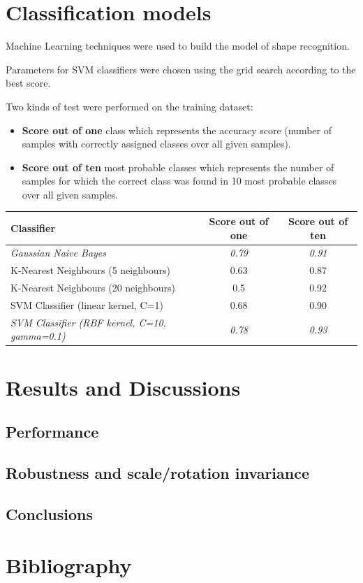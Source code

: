 \documentclass[12pt]{article}
\begin{document}
\section{Classification models}

Machine Learning techniques were used to build the model of shape recognition. 

Parameters for SVM classifiers were chosen using the grid search according to the best score.

Two kinds of test were performed on the training dataset:
\begin{itemize}
	\item \textbf{Score out of one} class which represents the accuracy score (number of samples with correctly assigned classes over all given samples).
	\item \textbf{Score out of ten} most probable classes which represents the number of samples for which the correct class was found in 10 most probable classes over all given samples.
\end{itemize}

\begin{center}
  \begin{tabular}{| l | c | c |}
    \hline
    \textbf{Classifier} & \textbf{Score out of one} & \textbf{Score out of ten}\\ \hline \hline
    \textit{Gaussian Naive Bayes} & \textit{0.79} & \textit{0.91} \\ \hline
	K-Nearest Neighbours (5 neighbours) & 0.63 & 0.87\\ \hline
	K-Nearest Neighbours (20 neighbours) & 0.5 & 0.92 \\ \hline
	SVM Classifier (linear kernel, C=1) & 0.68 & 0.90 \\ \hline
	\textit{SVM Classifier (RBF kernel, C=10, gamma=0.1)} & \textit{0.78} & \textit{0.93} \\ 
	\hline
  \end{tabular}
\end{center}


\section{Results and Discussions}
\subsection{Performance}
\subsection{Robustness and scale/rotation invariance}
\subsection{Conclusions}

\section{Bibliography}



\end{document}
